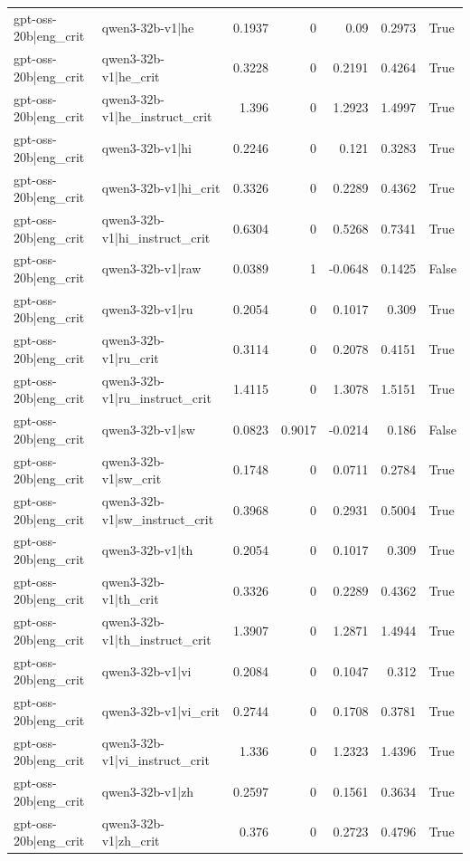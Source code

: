 \begin{table}
\begin{tabular}{l l r r r r l}
gpt-oss-20b|eng_crit & qwen3-32b-v1|he & 0.1937 & 0 & 0.09 & 0.2973 & True \\
gpt-oss-20b|eng_crit & qwen3-32b-v1|he_crit & 0.3228 & 0 & 0.2191 & 0.4264 & True \\
gpt-oss-20b|eng_crit & qwen3-32b-v1|he_instruct_crit & 1.396 & 0 & 1.2923 & 1.4997 & True \\
gpt-oss-20b|eng_crit & qwen3-32b-v1|hi & 0.2246 & 0 & 0.121 & 0.3283 & True \\
gpt-oss-20b|eng_crit & qwen3-32b-v1|hi_crit & 0.3326 & 0 & 0.2289 & 0.4362 & True \\
gpt-oss-20b|eng_crit & qwen3-32b-v1|hi_instruct_crit & 0.6304 & 0 & 0.5268 & 0.7341 & True \\
gpt-oss-20b|eng_crit & qwen3-32b-v1|raw & 0.0389 & 1 & -0.0648 & 0.1425 & False \\
gpt-oss-20b|eng_crit & qwen3-32b-v1|ru & 0.2054 & 0 & 0.1017 & 0.309 & True \\
gpt-oss-20b|eng_crit & qwen3-32b-v1|ru_crit & 0.3114 & 0 & 0.2078 & 0.4151 & True \\
gpt-oss-20b|eng_crit & qwen3-32b-v1|ru_instruct_crit & 1.4115 & 0 & 1.3078 & 1.5151 & True \\
gpt-oss-20b|eng_crit & qwen3-32b-v1|sw & 0.0823 & 0.9017 & -0.0214 & 0.186 & False \\
gpt-oss-20b|eng_crit & qwen3-32b-v1|sw_crit & 0.1748 & 0 & 0.0711 & 0.2784 & True \\
gpt-oss-20b|eng_crit & qwen3-32b-v1|sw_instruct_crit & 0.3968 & 0 & 0.2931 & 0.5004 & True \\
gpt-oss-20b|eng_crit & qwen3-32b-v1|th & 0.2054 & 0 & 0.1017 & 0.309 & True \\
gpt-oss-20b|eng_crit & qwen3-32b-v1|th_crit & 0.3326 & 0 & 0.2289 & 0.4362 & True \\
gpt-oss-20b|eng_crit & qwen3-32b-v1|th_instruct_crit & 1.3907 & 0 & 1.2871 & 1.4944 & True \\
gpt-oss-20b|eng_crit & qwen3-32b-v1|vi & 0.2084 & 0 & 0.1047 & 0.312 & True \\
gpt-oss-20b|eng_crit & qwen3-32b-v1|vi_crit & 0.2744 & 0 & 0.1708 & 0.3781 & True \\
gpt-oss-20b|eng_crit & qwen3-32b-v1|vi_instruct_crit & 1.336 & 0 & 1.2323 & 1.4396 & True \\
gpt-oss-20b|eng_crit & qwen3-32b-v1|zh & 0.2597 & 0 & 0.1561 & 0.3634 & True \\
gpt-oss-20b|eng_crit & qwen3-32b-v1|zh_crit & 0.376 & 0 & 0.2723 & 0.4796 & True \\

\end{tabular}
\end{table}
